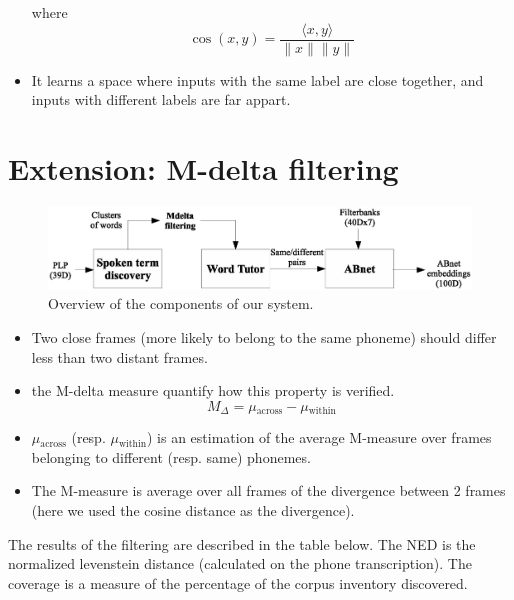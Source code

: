 \documentclass[final]{beamer}
\newcommand{\norm}[1]{\lVert#1\rVert}
\newcommand{\tup}[1]{\langle#1\rangle}
\begin{document}
\begin{frame}[t]
\begin{multicols}{3}
\begin{itemsize}
\begin{itemize}
\noindent        
where $$\cos(x, y) = \frac{\tup{x, y}}{\norm{x}\norm{y}}$$

\item It learns a space where inputs with the same label are close together, and inputs with different labels are far appart. 
\end{itemize}


\section{Extension: M-delta filtering}

\begin{figure}[ht!]
  \begin{center}
    \includegraphics[width=\columnwidth]{system_mdelta}
    \caption{\label{fig:system}Overview of the components of our system.}
  \end{center}
\end{figure}

\begin{itemize}
\item Two close frames (more likely to belong to the same phoneme) should differ less than two distant frames.
\item the M-delta measure quantify how this property is verified.
$$M_\Delta = \mu{}_{\mathrm{across}} - \mu{}_{\mathrm{within}}$$
\item $\mu{}_{\mathrm{across}}$ (resp. $\mu{}_{\mathrm{within}}$) is an estimation of the average M-measure over frames belonging to different (resp. same) phonemes.
\item The M-measure is average over all frames of the divergence between 2 frames (here we used the cosine distance as the divergence).
\end{itemize}

The results of the filtering are described in the table below. The NED is the normalized levenstein distance (calculated on the phone transcription). The coverage is a measure of the percentage of the corpus inventory discovered.


\end{itemsize}
\end{multicols}
\end{frame}
\end{document}
